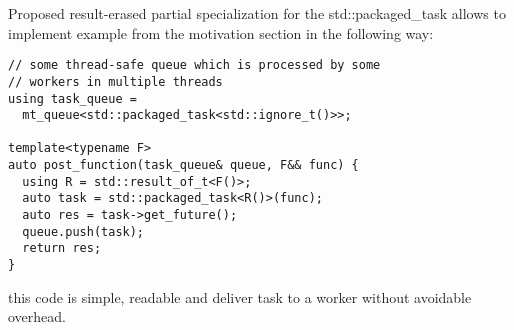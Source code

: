 \documentclass[ebook,openany,10pt,oneside,final]{memoir}
\begin{document}
Proposed result-erased partial specialization for the \mbox{std::packaged_task}
allows to implement example from the motivation section in the following way:

\begin{lstlisting}
// some thread-safe queue which is processed by some
// workers in multiple threads
using task_queue =
  mt_queue<std::packaged_task<std::ignore_t()>>;

template<typename F>
auto post_function(task_queue& queue, F&& func) {
  using R = std::result_of_t<F()>;
  auto task = std::packaged_task<R()>(func);
  auto res = task->get_future();
  queue.push(task);
  return res;
}
\end{lstlisting}
this code is simple, readable and deliver task to a worker without avoidable
overhead.
\end{document}
